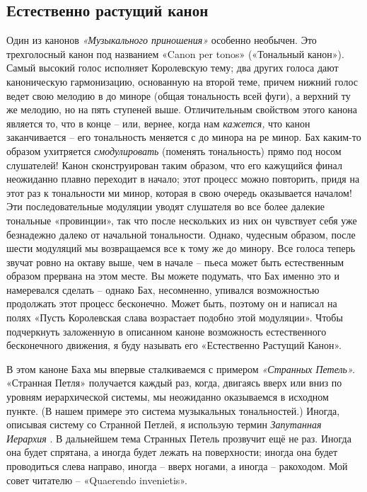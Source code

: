 \documentclass[../main.tex]{subfiles}
\begin{document}
\subsection{Естественно растущий канон}

Один из канонов \emph{«Музыкального приношения»} особенно необычен. Это трехголосный канон под названием «Canon per tonos» («Тональный канон»). Самый высокий голос исполняет Королевскую тему; два других голоса дают каноническую гармонизацию, основанную на второй теме, причем нижний голос ведет свою мелодию в до миноре (общая тональность всей фуги), а верхний  ту же мелодию, но на пять ступеней выше. Отличительным свойством этого канона является то, что в конце \--- или, вернее, когда нам \emph{кажется,} что канон заканчивается \--- его тональность меняется с до минора на ре минор. Бах каким-то образом ухитряется \emph{смодулировать} (поменять тональность) прямо под носом слушателей! Канон сконструирован таким образом, что его кажущийся финал неожиданно плавно переходит в начало; этот процесс можно повторить, придя на этот раз к тональности ми минор, которая в свою очередь оказывается началом! Эти последовательные модуляции уводят слушателя во все более далекие тональные «провинции», так что после нескольких из них он чувствует себя уже безнадежно далеко от начальной тональности. Однако, чудесным образом, после шести модуляций мы возвращаемся все к тому же до минору. Все голоса теперь звучат ровно на октаву выше, чем в начале \--- пьеса может быть естественным образом прервана на этом месте. Вы можете подумать, что Бах именно это и намеревался сделать \--- однако Бах, несомненно, упивался возможностью продолжать этот процесс бесконечно. Может быть, поэтому он и написал на полях «Пусть Королевская слава возрастает подобно этой модуляции». Чтобы подчеркнуть заложенную в описанном каноне возможность естественного бесконечного движения, я буду называть его «Естественно Растущий Канон».

В этом каноне Баха мы впервые сталкиваемся с примером \emph{«Странных Петель».} «Странная Петля» получается каждый раз, когда, двигаясь вверх или вниз по уровням иерархической системы, мы неожиданно оказываемся в исходном пункте. (В нашем примере это система музыкальных тональностей.) Иногда, описывая систему со Странной Петлей, я использую термин \emph{Запутанная Иерархия} . В дальнейшем тема Странных Петель прозвучит ещё не раз. Иногда она будет спрятана, а иногда будет лежать на поверхности; иногда она будет проводиться слева направо, иногда \--- вверх ногами, а иногда \--- ракоходом. Мой совет читателю \--- «Quaerendo invenietis».
\end{document}
